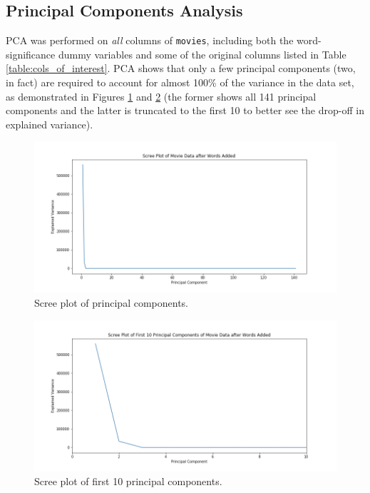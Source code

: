 \documentclass[12pt, oneside]{article}   	%
\begin{document}
\subsection{Principal Components Analysis}
\label{section:pca_results}

PCA was performed on \textit{all} columns of \texttt{movies}, including both the word-significance dummy variables and some of the original columns listed in Table \ref{table:cols_of_interest}. PCA shows that only a few principal components (two, in fact) are required to account for almost 100\% of the variance in the data set, as demonstrated in Figures \ref{fig:scree_whole} and \ref{fig:scree_first_10} (the former shows all 141 principal components and the latter is truncated to the first 10 to better see the drop-off in explained variance). 

\begin{figure}%
\includegraphics[width=\textwidth]{scree_whole}
\caption{\label{fig:scree_whole}Scree plot of principal components.}
\end{figure}

\begin{figure}%
\includegraphics[width=\textwidth]{scree_first_10}
\caption{\label{fig:scree_first_10}Scree plot of first 10 principal components.}
\end{figure}
\end{document}
